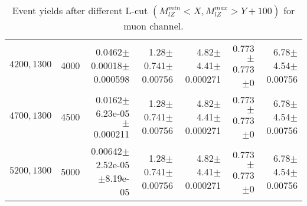 \documentclass[]{article}
\begin{document}
\begin{table}
\begin{center}
{\begin{tabular}{ |r|r|r|r|r|r|r|}
$4200,1300$ & 4000 & 0.0462$\pm$0.00018$\pm$0.000598 & 1.28$\pm$0.741$\pm$0.00756 & 4.82$\pm$4.41$\pm$0.000271 & 0.773$\pm$0.773$\pm$0 & 6.78$\pm$4.54$\pm$0.00756 \\
$4700,1300$ & 4500 & 0.0162$\pm$6.23e-05$\pm$0.000211 & 1.28$\pm$0.741$\pm$0.00756 & 4.82$\pm$4.41$\pm$0.000271 & 0.773$\pm$0.773$\pm$0 & 6.78$\pm$4.54$\pm$0.00756 \\
$5200,1300$ & 5000 & 0.00642$\pm$2.52e-05$\pm$8.19e-05 & 1.28$\pm$0.741$\pm$0.00756 & 4.82$\pm$4.41$\pm$0.000271 & 0.773$\pm$0.773$\pm$0 & 6.78$\pm$4.54$\pm$0.00756 \\
\hline 
\end{tabular}
}
\end{center}
\caption{Event yields after different L-cut $(M_{lZ}^{min} < X, M_{lZ}^{max} > Y + 100)$ for muon channel.}
\end{table}
\end{document}
